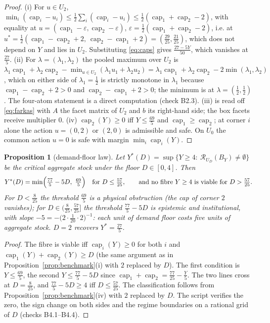 \documentclass[11pt,a4paper]{article}
\theoremstyle{plain}
\newtheorem{proposition}[theorem]{Proposition}
\theoremstyle{definition}
\theoremstyle{remark}
\newcommand{\calR}{\mathcal{R}}
\newcommand{\capi}[1]{\operatorname{cap}_{#1}}
\newcommand{\tfr}[2]{\tfrac{#1}{#2}}
\begin{document}
\begin{proof}
(i) For $u\in U_2$, $\min_i(\capi{i}-u_i)\le\tfr12\sum_i(\capi{i}-u_i)\le\tfr12(\capi{1}+\capi{2}-2)$, with equality at $u=(\capi{1}-\varepsilon,\capi{2}-\varepsilon)$, $\varepsilon=\tfr12(\capi{1}+\capi{2}-2)$, i.e. at $u^\ast=\tfr12(\capi{1}-\capi{2}+2,\ \capi{2}-\capi{1}+2)=(\tfr{29}{25},\tfr{21}{25})$, which does not depend on $Y$ and lies in $U_2$. Substituting \eqref{eq:caps} gives $\tfr{27-5Y}{50}$, which vanishes at $\tfr{27}5$. (ii) For $\lambda=(\lambda_1,\lambda_2)$ the pooled maximum over $U_2$ is $\lambda_1\capi{1}+\lambda_2\capi{2}-\min_{u\in U_2}(\lambda_1u_1+\lambda_2u_2)=\lambda_1\capi{1}+\lambda_2\capi{2}-2\min(\lambda_1,\lambda_2)$, which on either side of $\lambda_1=\tfr12$ is strictly monotone in $\lambda_1$ because $\capi{1}-\capi{2}+2>0$ and $\capi{2}-\capi{1}+2>0$; the minimum is at $\lambda=(\tfr12,\tfr12)$. The four-atom statement is a direct computation (check B2.3). (iii) is read off \eqref{eq:farkas} with $A$ the facet matrix of $U_2$ and $b$ its right-hand side; the box facets receive multiplier $0$. (iv) $\capi{2}(Y)\ge0$ iff $Y\le\tfr{69}5$ and $\capi{1}\ge\capi{2}$; at corner $i$ alone the action $u=(0,2)$ or $(2,0)$ is admissible and safe. On $U_0$ the common action $u=0$ is safe with margin $\min_i\capi{i}(Y)$.
\end{proof}

\begin{proposition}[demand-floor law]\label{prop:floor}
Let $Y^\ast(D)=\sup\{Y\ge4:\ \calR_{U_D}(B_Y)\neq\emptyset\}$ be the critical aggregate stock under the floor $D\in[0,4]$. Then
\begin{equation}\label{eq:floorlaw}
Y^\ast(D)=\min\Bigl(\tfrac{77}{5}-5D,\ \tfrac{69}{5}\Bigr)\quad\text{for }D\le\tfr{57}{25},\qquad\text{and no fibre } Y\ge4 \text{ is viable for } D>\tfr{57}{25}.
\end{equation}
For $D<\tfr8{25}$ the threshold $\tfr{69}5$ is a physical obstruction (the cap of corner $2$ vanishes); for $D\in(\tfr8{25},\tfr{57}{25}]$ the threshold $\tfr{77}5-5D$ is epistemic and institutional, with slope $-5=-\bigl(2\cdot\tfr1{20}\cdot2\bigr)^{-1}$: each unit of demand floor costs five units of aggregate stock. $D=2$ recovers $Y^\ast=\tfr{27}5$.
\end{proposition}

\begin{proof}
The fibre is viable iff $\capi{i}(Y)\ge0$ for both $i$ and $\capi{1}(Y)+\capi{2}(Y)\ge D$ (the same argument as in Proposition~\ref{prop:benchmark}(i) with $2$ replaced by $D$). The first condition is $Y\le\tfr{69}5$, the second $Y\le\tfr{77}5-5D$ since $\capi{1}+\capi{2}=\tfr{77}{25}-\tfr Y5$. The two lines cross at $D=\tfr8{25}$, and $\tfr{77}5-5D\ge4$ iff $D\le\tfr{57}{25}$. The classification follows from Proposition~\ref{prop:benchmark}(iv) with $2$ replaced by $D$. The script verifies the zero, the sign change on both sides and the regime boundaries on a rational grid of $D$ (checks B4.1--B4.4).
\end{proof}
\end{document}
